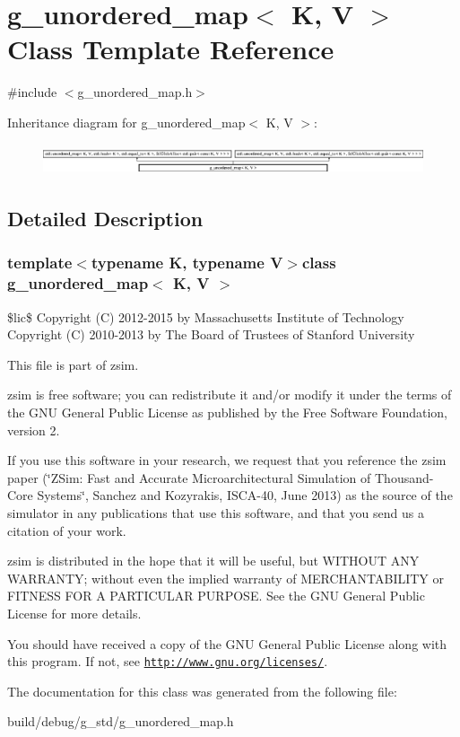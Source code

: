 \hypertarget{classg__unordered__map}{\section{g\-\_\-unordered\-\_\-map$<$ K, V $>$ Class Template Reference}
\label{classg__unordered__map}
}


{\ttfamily \#include $<$g\-\_\-unordered\-\_\-map.\-h$>$}

Inheritance diagram for g\-\_\-unordered\-\_\-map$<$ K, V $>$\-:\begin{figure}[H]
\begin{center}
\leavevmode
\includegraphics[height=0.915033cm]{classg__unordered__map}
\end{center}
\end{figure}


\subsection{Detailed Description}
\subsubsection*{template$<$typename K, typename V$>$class g\-\_\-unordered\-\_\-map$<$ K, V $>$}

\$lic\$ Copyright (C) 2012-\/2015 by Massachusetts Institute of Technology Copyright (C) 2010-\/2013 by The Board of Trustees of Stanford University

This file is part of zsim.

zsim is free software; you can redistribute it and/or modify it under the terms of the G\-N\-U General Public License as published by the Free Software Foundation, version 2.

If you use this software in your research, we request that you reference the zsim paper (\char`\"{}\-Z\-Sim\-: Fast and Accurate Microarchitectural Simulation of
\-Thousand-\/\-Core Systems\char`\"{}, Sanchez and Kozyrakis, I\-S\-C\-A-\/40, June 2013) as the source of the simulator in any publications that use this software, and that you send us a citation of your work.

zsim is distributed in the hope that it will be useful, but W\-I\-T\-H\-O\-U\-T A\-N\-Y W\-A\-R\-R\-A\-N\-T\-Y; without even the implied warranty of M\-E\-R\-C\-H\-A\-N\-T\-A\-B\-I\-L\-I\-T\-Y or F\-I\-T\-N\-E\-S\-S F\-O\-R A P\-A\-R\-T\-I\-C\-U\-L\-A\-R P\-U\-R\-P\-O\-S\-E. See the G\-N\-U General Public License for more details.

You should have received a copy of the G\-N\-U General Public License along with this program. If not, see \href{http://www.gnu.org/licenses/}{\tt http\-://www.\-gnu.\-org/licenses/}. 

The documentation for this class was generated from the following file\-:\begin{DoxyCompactItemize}
\item 
build/debug/g\-\_\-std/g\-\_\-unordered\-\_\-map.\-h\end{DoxyCompactItemize}

